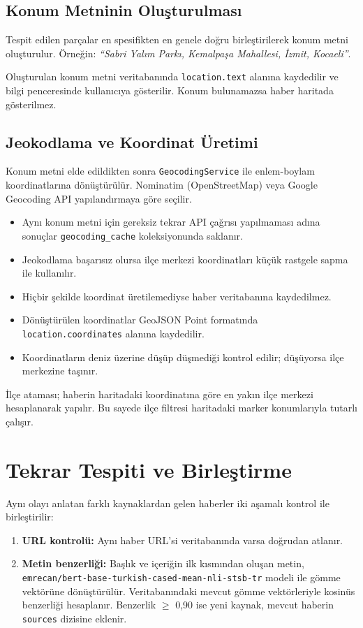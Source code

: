 \documentclass[conference,a4paper]{IEEEtran}
\begin{document}
\subsection{Konum Metninin Oluşturulması}
Tespit edilen parçalar en spesifikten en genele doğru birleştirilerek konum metni oluşturulur. Örneğin: \emph{``Sabri Yalım Parkı, Kemalpaşa Mahallesi, İzmit, Kocaeli''}.

Oluşturulan konum metni veritabanında \texttt{location.text} alanına kaydedilir ve bilgi penceresinde kullanıcıya gösterilir. Konum bulunamazsa haber haritada gösterilmez.

\subsection{Jeokodlama ve Koordinat Üretimi}
Konum metni elde edildikten sonra \texttt{GeocodingService} ile enlem-boylam koordinatlarına dönüştürülür. Nominatim (OpenStreetMap) veya Google Geocoding API yapılandırmaya göre seçilir.

\begin{itemize}
    \item Aynı konum metni için gereksiz tekrar API çağrısı yapılmaması adına sonuçlar \texttt{geocoding\_cache} koleksiyonunda saklanır.
    \item Jeokodlama başarısız olursa ilçe merkezi koordinatları küçük rastgele sapma ile kullanılır.
    \item Hiçbir şekilde koordinat üretilemediyse haber veritabanına kaydedilmez.
    \item Dönüştürülen koordinatlar GeoJSON Point formatında \texttt{location.coordinates} alanına kaydedilir.
    \item Koordinatların deniz üzerine düşüp düşmediği kontrol edilir; düşüyorsa ilçe merkezine taşınır.
\end{itemize}

İlçe ataması; haberin haritadaki koordinatına göre en yakın ilçe merkezi hesaplanarak yapılır. Bu sayede ilçe filtresi haritadaki marker konumlarıyla tutarlı çalışır.

\section{Tekrar Tespiti ve Birleştirme}
Aynı olayı anlatan farklı kaynaklardan gelen haberler iki aşamalı kontrol ile birleştirilir:

\begin{enumerate}
    \item \textbf{URL kontrolü:} Aynı haber URL'si veritabanında varsa doğrudan atlanır.
    \item \textbf{Metin benzerliği:} Başlık ve içeriğin ilk kısmından oluşan metin, \texttt{emrecan/bert-base-turkish-cased-mean-nli-stsb-tr} modeli ile gömme vektörüne dönüştürülür. Veritabanındaki mevcut gömme vektörleriyle kosinüs benzerliği hesaplanır. Benzerlik $\geq$ 0,90 ise yeni kaynak, mevcut haberin \texttt{sources} dizisine eklenir.
\end{enumerate}
\end{document}
